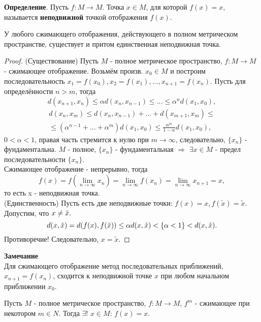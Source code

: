 \textbf{Определение}. Пусть $f : M \rightarrow M$. Точка $x \in M$, для которой $f(x) = x$, называется \textbf{неподвижной} точкой отображения $f(x)$.

\begin{theorem}
    У любого сжимающего отображения, действующего в полном метрическом
пространстве, существует и притом единственная неподвижная точка.
\end{theorem}
\begin{proof}
    (Существование)
Пусть $M$ - полное метрическое пространство, $f : M \rightarrow M$ - сжимающее отображение. Возьмём произв. $x_0 \in M$ и построим последовательность $x_1 = f(x_0), x_2 = f(x_1), ..., x_{n+1} = f(x_n)$. Пусть для определённости $n > m$, тогда
\begin{equation*}
    d(x_{n+1}, x_n) \leq \alpha d(x_n, x_{n-1}) \leq ... \leq \alpha^nd(x_1, x_0),
\end{equation*}
\begin{gather*}
    d(x_n, x_m) \leq d(x_n, x_{n-1}) + ... + d(x_{m+1}, x_m) \leq \\
    \leq (\alpha^{n-1}+...+\alpha^m)d(x_1, x_0) \leq \frac{\alpha^m}{1-\alpha}d(x_1,x_0),
\end{gather*}
$0 < \alpha < 1$, правая часть стремится к нулю при $m \rightarrow \infty$, следовательно, $\{x_n\}$ - фундаментальна.
$M$ - полное, $\{x_n\}$ - фундаментальная $\Rightarrow$ $\exists x \in M$ - предел последовательности  $\{x_n\}$. \\
Сжимающее отображение - непрерывно, тогда
\begin{equation*}
    f(x) = f(\lim\limits_{n \to \infty} x_n) = \lim\limits_{n \to \infty} f(x_n) = \lim\limits_{n \to \infty} x_{n+1} = x,
\end{equation*}
то есть x - неподвижная точка. \\
(Единственность)
Пусть есть две неподвижные точки: $f(x) = x, f(\tilde{x}) = \tilde{x}.$ Допустим, что $x \neq \Tilde{x}.$
\begin{equation*}
    d(x, \Tilde{x}) = d(f(x), f(\Tilde{x})) \leq \alpha d(x, \Tilde{x}) < \{\alpha < 1\} < d(x, \tilde{x}).
\end{equation*}
Противоречие! Следовательно, $x=\tilde{x}$.
\end{proof}
\textbf{Замечание} \\
Для сжимающего отображение метод последовательных приближений,
$x_{n+1} = f(x_n)$, сходится к неподвижной точке $x$ при любом начальном приближении $x_0$.
\begin{theorem}
    Пусть $M$ - полное метрическое пространство, $f : M \rightarrow M$, $f^m$ - сжимающее при некотором $m \in N$. Тогда $\exists!$ $x \in M$: $f(x) = x$.
\end{theorem}
